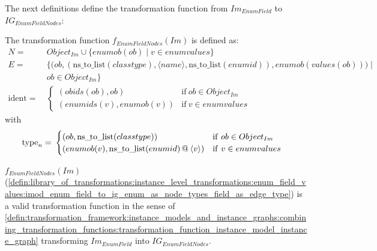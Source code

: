 The next definitions define the transformation function from $Im_{EnumField}$ to $IG_{EnumFieldNodes}$:

\begin{defin}
\label{defin:library_of_transformations:instance_level_transformations:enum_field_values:imod_enum_field_to_ig_enum_as_node_types_field_as_edge_type}
The transformation function $f_{EnumFieldNodes}(Im)$ is defined as:
\begin{align*}
N =\ & Object_{Im} \cup \{enumob(ob) \mid v \in enumvalues\}  \\
E =\ & \big\{\big(ob, (\mathrm{ns\_\!to\_\!list}(classtype), \langle name \rangle, \mathrm{ns\_\!to\_\!list}(enumid)), enumob(values(ob))\big) \mid \\&ob \in Object_{Im} \big\} \\
\mathrm{ident} =\ & \begin{cases}
    (obids(ob), ob) & \mathrm{if }\ ob \in Object_{Im}\\
    (enumids(v), enumob(v)) & \mathrm{if }\ v \in enumvalues
\end{cases}
\end{align*}
with
\begin{align*}
\mathrm{type}_n =\ & \begin{cases}
    (ob, \mathrm{ns\_\!to\_\!list}(classtype)) & \mathrm{if }\ ob \in Object_{Im}\\
    (enumob(v), \mathrm{ns\_\!to\_\!list}(enumid) \operatorname{@\:} \langle v \rangle) & \mathrm{if }\ v \in enumvalues
\end{cases}
\end{align*}
\end{defin}

\begin{thm}
\label{defin:library_of_transformations:instance_level_transformations:enum_field_values:imod_enum_field_to_ig_enum_as_node_types_field_as_edge_type_func}
$f_{EnumFieldNodes}(Im)$ (\cref{defin:library_of_transformations:instance_level_transformations:enum_field_values:imod_enum_field_to_ig_enum_as_node_types_field_as_edge_type}) is a valid transformation function in the sense of \cref{defin:transformation_framework:instance_models_and_instance_graphs:combining_transformation_functions:transformation_function_instance_model_instance_graph} transforming $Im_{EnumField}$ into $IG_{EnumFieldNodes}$.
\end{thm}

